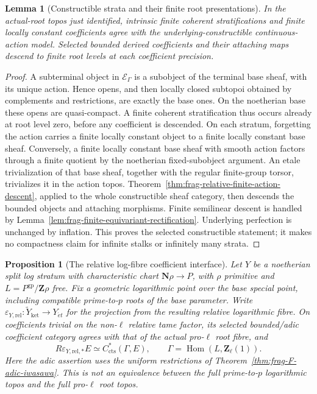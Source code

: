 \documentclass[11pt]{article}
\newtheorem{proposition}[theorem]{Proposition}
\newtheorem{lemma}[theorem]{Lemma}
\theoremstyle{definition}
\theoremstyle{remark}
\begin{document}
\begin{lemma}[Constructible strata and their finite root presentations]
\label{lem:frag-coherent-constructible-root-descent}
In the actual-root topos just identified, intrinsic finite coherent
stratifications and finite locally constant coefficients agree with
the underlying-constructible continuous-action model.  Selected
bounded derived coefficients and their attaching maps descend to
finite root levels at each coefficient precision.
\end{lemma}
\begin{proof}
A subterminal object in $\mathscr E_\Gamma$ is a subobject of the
terminal base sheaf, with its unique action.  Hence opens, and then
locally closed subtopoi obtained by complements and restrictions,
are exactly the base ones.  On the noetherian base these opens are
quasi-compact.  A finite coherent stratification thus occurs already
at root level zero, before any coefficient is descended.
On each stratum, forgetting the action carries a finite locally
constant object to a finite locally constant base sheaf.  Conversely,
a finite locally constant base sheaf with smooth action factors
through a finite quotient by the noetherian fixed-subobject argument.
An etale trivialization of that base sheaf, together with the regular
finite-group torsor, trivializes it in the action topos.
Theorem~\ref{thm:frag-relative-finite-action-descent}, applied to the
whole constructible sheaf category, then descends the bounded objects
and attaching morphisms.
Finite semilinear descent is handled by
Lemma~\ref{lem:frag-finite-equivariant-rectification}.  Underlying
perfection is unchanged by inflation.  This proves the selected
constructible statement; it makes no compactness claim for infinite
stalks or infinitely many strata.
\end{proof}


\begin{proposition}[The relative log-fibre coefficient interface]
\label{prop:frag-relative-log-root-interface}
Let $Y$ be a noetherian split log stratum with characteristic chart
$\mathbf N\rho\to P$, with $\rho$ primitive and
$L=P^{\mathrm{gp}}/\mathbf Z\rho$ free.  Fix a geometric logarithmic
point over the base special point, including compatible prime-to-$p$
roots of the base parameter.  Write
$\varepsilon_{Y,\mathrm{rel}}:\widetilde Y_{\mathrm{ket}}\to Y_{\acute et}$
for the projection from the resulting relative logarithmic fibre.
On coefficients trivial on the non-$\ell$ relative tame factor, its
selected bounded/adic coefficient category agrees with that of the
actual pro-$\ell$ root fibre, and
\[
 R\varepsilon_{Y,\mathrm{rel},*}E
 \simeq C^*_{\mathrm{cts}}(\Gamma,E),\qquad
 \Gamma=\operatorname{Hom}(L,\mathbf Z_\ell(1)).
\]
Here the adic assertion uses the uniform restrictions of Theorem~\ref{thm:frag-F-adic-iwasawa}.
This is not an equivalence between the full prime-to-$p$ logarithmic
topos and the full pro-$\ell$ root topos.
\end{proposition}
\end{document}
